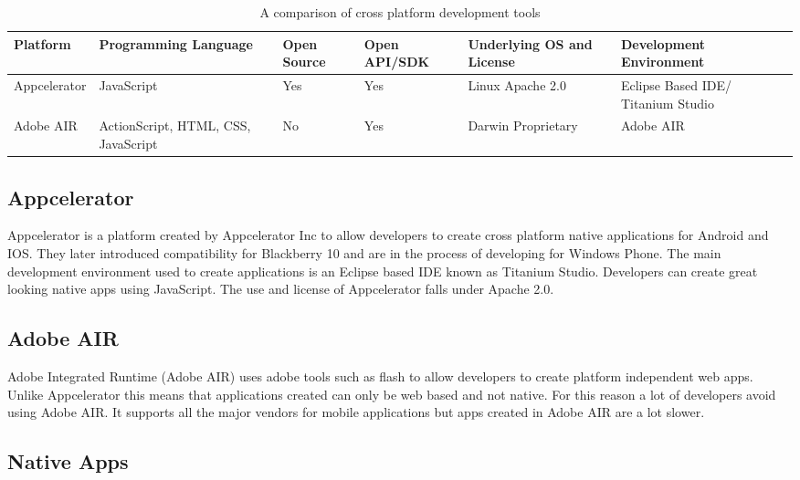 \begin{table}[H]
    \centering
    \begin{tabular}{|p{2.5cm}|p{2.7cm}|p{1.8cm}|p{2cm}|p{2.8cm}|p{2.8cm}|}
    \hline
    \textbf{Platform} & \textbf{Programming Language} & \textbf{Open Source} & \textbf{Open API/SDK} & \textbf{Underlying OS and License} & \textbf{Development Environment}          \\ \hline
    Appcelerator & JavaScript                          & Yes         & Yes  & Linux Apache 2.0        & Eclipse Based IDE/ Titanium Studio \\ \hline
    Adobe AIR    & ActionScript, HTML, CSS, JavaScript & No          & Yes   & Darwin Proprietary       & Adobe AIR                          \\ \hline
    \end{tabular}
     \caption {A comparison of cross platform development tools}
\end{table}

\newpage
\subsection{Appcelerator}

Appcelerator is a platform created by Appcelerator Inc to allow developers to create cross platform native applications for Android and IOS. They later introduced compatibility for Blackberry 10 and are in the process of developing for Windows Phone. The main development environment used to create applications is an Eclipse based IDE known as Titanium Studio. Developers can create great looking native apps using JavaScript. The use and license of Appcelerator falls under Apache 2.0.

\subsection{Adobe AIR}

Adobe Integrated Runtime (Adobe AIR) uses adobe tools such as flash to allow developers to create platform independent web apps. Unlike Appcelerator this means that applications created can only be web based and not native. For this reason a lot of developers avoid using Adobe AIR. It supports all the major vendors for mobile applications but apps created in Adobe AIR are a lot slower.


\newpage
\subsection{Native Apps}

